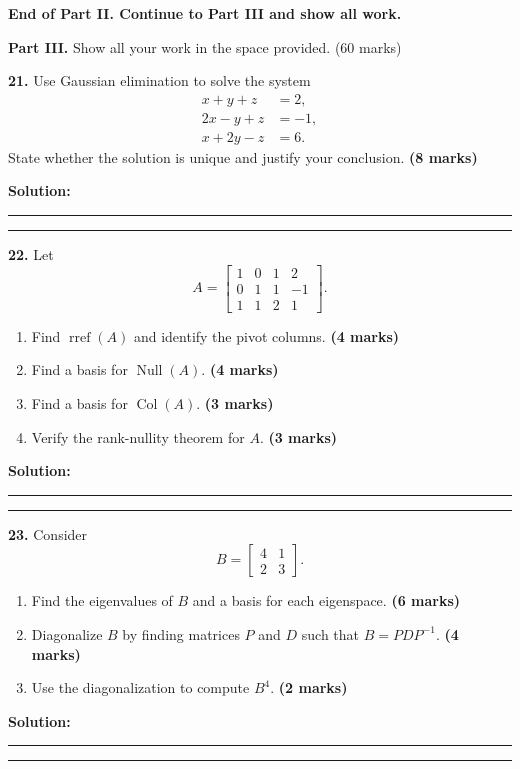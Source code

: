\documentclass[11pt,a4paper]{article}
\newcommand{\parttitle}[2]{%
  \vspace{1mm}
  {\color{examblue}\Large\bfseries #1}\quad
  {\color{examblue}\large #2}\par\vspace{3mm}
}
\newcommand{\answerbox}[1]{%
  \par\vspace{2mm}
  {\color{rulegray}\noindent\rule{\linewidth}{0.4pt}\par}
  \vspace{#1}
  {\color{rulegray}\noindent\rule{\linewidth}{0.4pt}\par}
}
\newcommand{\markpts}[1]{\hfill\textbf{(#1 marks)}}
\begin{document}
\vspace{4mm}
{\color{examblue}\bfseries End of Part II. Continue to Part III and show all work.}

\newpage
\parttitle{Part III.}{Show all your work in the space provided. (60 marks)}

\textbf{21.} Use Gaussian elimination to solve the system
\[
\begin{aligned}
x+y+z&=2,\\
2x-y+z&=-1,\\
x+2y-z&=6.
\end{aligned}
\]
State whether the solution is unique and justify your conclusion. \markpts{8}

\textbf{Solution:}
\answerbox{100mm}

\newpage
\textbf{22.} Let
\[
A=\begin{bmatrix}
1&0&1&2\\
0&1&1&-1\\
1&1&2&1
\end{bmatrix}.
\]
\begin{enumerate}[label=(\alph*),leftmargin=9mm]
  \item Find $\operatorname{rref}(A)$ and identify the pivot columns. \markpts{4}
  \item Find a basis for $\operatorname{Null}(A)$. \markpts{4}
  \item Find a basis for $\operatorname{Col}(A)$. \markpts{3}
  \item Verify the rank-nullity theorem for $A$. \markpts{3}
\end{enumerate}

\textbf{Solution:}
\answerbox{130mm}

\newpage
\textbf{23.} Consider
\[
B=\begin{bmatrix}4&1\\2&3\end{bmatrix}.
\]
\begin{enumerate}[label=(\alph*),leftmargin=9mm]
  \item Find the eigenvalues of $B$ and a basis for each eigenspace. \markpts{6}
  \item Diagonalize $B$ by finding matrices $P$ and $D$ such that $B=PDP^{-1}$. \markpts{4}
  \item Use the diagonalization to compute $B^{4}$. \markpts{2}
\end{enumerate}

\textbf{Solution:}
\answerbox{120mm}
\end{document}
